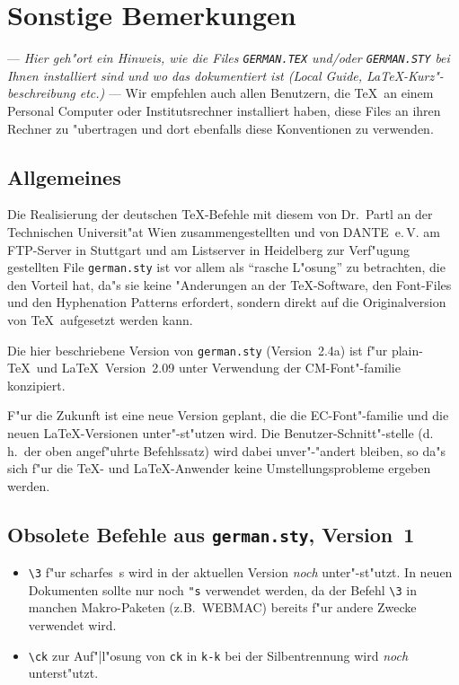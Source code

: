 \section{Sonstige Bemerkungen}

--- {\em Hier geh"ort ein Hinweis, wie die Files
\verb:GERMAN.TEX: und/oder \verb:GERMAN.STY: bei Ihnen
installiert sind und wo das dokumentiert ist (Local Guide,
\LaTeX-Kurz"-beschreibung etc.)} --- Wir empfehlen auch allen
Benutzern, die \TeX\ an einem Personal Computer oder
Institutsrechner installiert haben, diese Files an ihren Rechner
zu "ubertragen und dort ebenfalls diese Konventionen zu
verwenden.


\subsection{Allgemeines}

Die Realisierung der deutschen \TeX-Befehle mit diesem von Dr.~Partl
an der Technischen Universit"at Wien zusammengestellten und von
DANTE~e.\,V. am FTP-Server in Stuttgart und am Listserver in
Heidelberg zur Verf"ugung gestellten File \verb:german.sty: ist vor
allem als "`rasche L"osung"' zu betrachten, die den Vorteil hat, da"s
sie keine "Anderungen an der \TeX-Software, den Font-Files und den
Hyphenation Patterns erfordert, sondern direkt auf die Originalversion
von \TeX\ aufgesetzt werden kann.

Die hier beschriebene Version von \verb:german.sty:
(Version~2.4a) ist f"ur plain-\TeX\ und \LaTeX\ Version~2.09
unter Verwendung der CM-Font"-familie konzipiert.

F"ur die Zukunft ist eine neue Version geplant, die die
EC-Font"-familie und die neuen \LaTeX-Versionen unter"-st"utzen
wird. Die Benutzer-Schnitt"-stelle (d.\,h.\ der oben angef"uhrte
Befehlssatz) wird dabei unver"-"andert bleiben, so da"s sich f"ur
die \TeX- und \LaTeX-Anwender keine Umstellungsprobleme ergeben
werden.


\subsection{Obsolete Befehle aus {\tt german.sty}, Version~1}

\begin{itemize}
\item \verb:\3: f"ur scharfes~s wird in der aktuellen Version
  {\em noch\/} unter"-st"utzt. In neuen Dokumenten sollte nur
  noch \verb:"s: verwendet werden, da der Befehl \verb:\3: in
  manchen Makro-Paketen (z.B.~WEBMAC) bereits f"ur andere Zwecke
  verwendet wird.
\item \verb:\ck: zur Auf"|l"osung von \verb:ck: in \verb:k-k:
  bei der Silbentrennung wird {\em noch\/} unterst"utzt.
\end{itemize}


